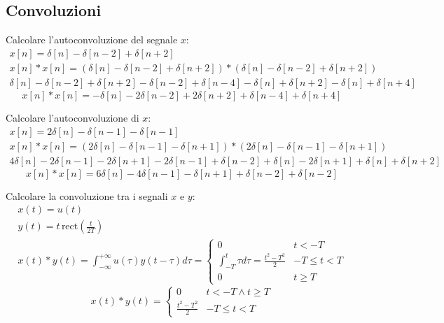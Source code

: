 \documentclass{article}
\begin{document}
\subsection{Convoluzioni}

Calcolare l'autoconvoluzione del segnale $x$:
\begin{gather*}
    x[n]=\delta[n]-\delta[n-2]+\delta[n+2]\\
    x[n]*x[n]=(\delta[n]-\delta[n-2]+\delta[n+2])*(\delta[n]-\delta[n-2]+\delta[n+2])\\
    \delta[n]-\delta[n-2]+\delta[n+2]-\delta[n-2]+\delta[n-4]-\delta[n]+\delta[n+2]-\delta[n]+\delta[n+4]
\end{gather*}
\begin{equation}
    x[n]*x[n]=-\delta[n]-2\delta[n-2]+2\delta[n+2]+\delta[n-4]+\delta[n+4]
\end{equation}




Calcolare l'autoconvoluzione di $x$:
\begin{gather*}
    x[n]=2\delta[n]-\delta[n-1]-\delta[n-1]\\
    x[n]*x[n]=(2\delta[n]-\delta[n-1]-\delta[n+1])*(2\delta[n]-\delta[n-1]-\delta[n+1])\\
    4\delta[n]-2\delta[n-1]-2\delta[n+1]-2\delta[n-1]+\delta[n-2]+\delta[n]-2\delta[n+1]+\delta[n]+\delta[n+2]
\end{gather*}
\begin{equation}
    x[n]*x[n]=6\delta[n]-4\delta[n-1]-\delta[n+1]+\delta[n-2]+\delta[n-2]
\end{equation}



Calcolare la convoluzione tra i segnali $x$ e $y$:
\begin{gather*}
    x(t)=u(t)\\
    y(t)=t\,\mbox{rect}\displaystyle\left(\frac{t}{2T}\right)\\
    x(t)*y(t)=\displaystyle\int_{-\infty}^{+\infty}u(\tau)y(t-\tau)d\tau=\begin{cases}
        0&t<-T\\
        \displaystyle\int_{-T}^{t}\tau d\tau=\frac{t^2-T^2}{2}&-T\leq t<T\\
        0& t\geq T
    \end{cases}
\end{gather*}
\begin{equation}
    x(t)*y(t)=\begin{cases}
        0& t<-T\land t\geq T\\
        \displaystyle\frac{t^2-T^2}{2}&-T\leq t<T
    \end{cases}
\end{equation}
\end{document}
